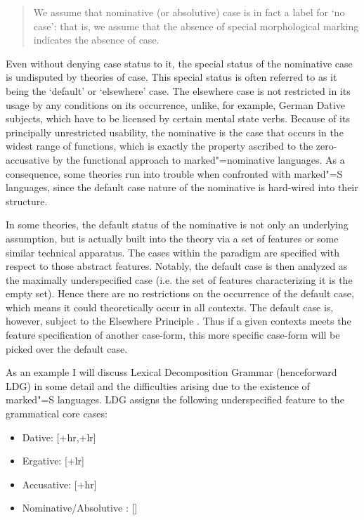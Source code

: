\begin{quote}
We assume that nominative (or absolutive) case is in fact a label for `no case': that is, we assume that the absence of special morphological marking indicates the absence of case. 
\citep[322]{deHoop:2005}
\end{quote}

Even without denying case status to it, the special status of the nominative case is undisputed by theories of case. 
This special status is often referred to as it being the {`default'} or {`elsewhere'} case. 
The elsewhere case is not restricted in its usage by any conditions on its occurrence, unlike, for example, German Dative subjects, which have to be licensed by certain mental state verbs.
Because of its principally unrestricted usability, the nominative is the case that occurs in the widest range of functions, which is exactly the property ascribed to the zero-accusative by the functional approach to marked"=nominative languages. 
As a consequence, some theories run into trouble when confronted with marked"=S languages, since the default case nature of the nominative is hard-wired into their structure. 

In some theories, the default status of the nominative is not only an underlying assumption, but is actually built into the theory via a set of features or some similar technical apparatus.
The cases within the paradigm are specified with respect to those abstract features. 
Notably, the default case is then analyzed as the maximally underspecified case (i.e. the set of features characterizing it is the empty set).
Hence there are no restrictions on the occurrence of the default case, which means it could theoretically occur in all contexts.
The default case is, however, subject to the Elsewhere Principle \citep{Kiparsky:1973}.
Thus if a given contexts meets the feature specification of another case-form, this more specific case-form will be picked over the default case.
 
As an example I will discuss Lexical Decomposition Grammar (henceforward LDG) in some detail and the difficulties arising due to the existence of marked"=S languages. 
LDG \citep{Wunderlich:1997,Stiebels:2002} assigns the following underspecified feature to the grammatical core cases:

\begin{itemize}
\item Dative: [+hr,+lr] 
\item Ergative: [+lr] 
\item Accusative: [+hr] 
\item Nominative/Absolutive  : [\quad]
\end{itemize}

